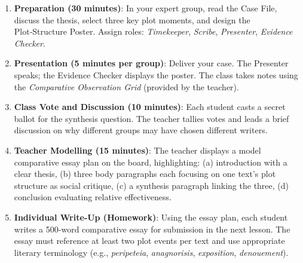 \documentclass[11pt]{article}
\newcounter{popsec}
\newcounter{popsub}
\newcommand{\courssub}[1]{%
  \stepcounter{popsub}%
  \par\vspace{9pt}\noindent{\popxbold\fontsize{11.5}{13}\selectfont\color{popink}{\color{poporange}\thepopsec.\thepopsub}\hspace{6pt}#1}\par\nopagebreak\vspace{4pt}
}
\begin{document}
\courssub{Tasks}
\begin{methode}
\begin{enumerate}
    \item \textbf{Preparation (30 minutes)}: In your expert group, read the Case File, discuss the thesis, select three key plot moments, and design the Plot‑Structure Poster. Assign roles: \emph{Timekeeper}, \emph{Scribe}, \emph{Presenter}, \emph{Evidence Checker}.
    \item \textbf{Presentation (5 minutes per group)}: Deliver your case. The Presenter speaks; the Evidence Checker displays the poster. The class takes notes using the \emph{Comparative Observation Grid} (provided by the teacher).
    \item \textbf{Class Vote and Discussion (10 minutes)}: Each student casts a secret ballot for the synthesis question. The teacher tallies votes and leads a brief discussion on why different groups may have chosen different writers.
    \item \textbf{Teacher Modelling (15 minutes)}: The teacher displays a model comparative essay plan on the board, highlighting: (a) introduction with a clear thesis, (b) three body paragraphs each focusing on one text's plot structure as social critique, (c) a synthesis paragraph linking the three, (d) conclusion evaluating relative effectiveness.
    \item \textbf{Individual Write‑Up (Homework)}: Using the essay plan, each student writes a 500‑word comparative essay for submission in the next lesson. The essay must reference at least two plot events per text and use appropriate literary terminology (e.g., \emph{peripeteia}, \emph{anagnorisis}, \emph{exposition}, \emph{denouement}).
\end{enumerate}
\end{methode}
\end{document}
